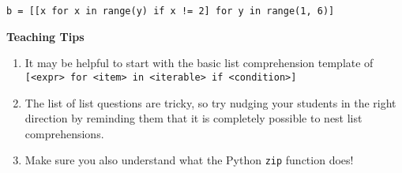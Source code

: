 \begin{blocksection}
\begin{parts}
\begin{solution}[0.25in]
\begin{lstlisting}
b = [[x for x in range(y) if x != 2] for y in range(1, 6)]
\end{lstlisting}
\end{solution}
\end{parts}
\begin{blocksection}
    \begin{guide}
    \textbf{Teaching Tips}
    \begin{enumerate}
            \item It may be helpful to start with the basic list comprehension template of \texttt{[<expr> for <item> in <iterable> if <condition>]}
            \item The list of list questions are tricky, so try nudging your students in the right direction by reminding them that it is completely possible to nest list comprehensions.
            \item Make sure you also understand what the Python \texttt{zip} function does!
    \end{enumerate}
    \end{guide}
\end{blocksection}
\end{blocksection}
